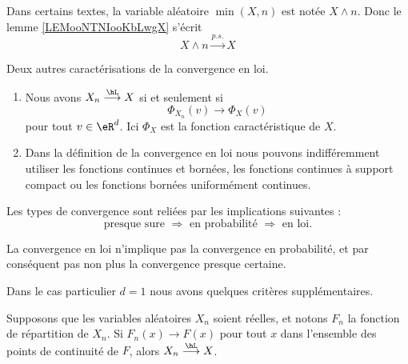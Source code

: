 \begin{normaltext}
	Dans certains textes, la variable aléatoire \( \min(X,n)\) est notée \( X\wedge n\). Donc le lemme \ref{LEMooNTNIooKbLwgX} s'écrit
	\begin{equation}
		X\wedge n\stackrel{p.s.}{\longrightarrow}X
	\end{equation}
\end{normaltext}

\begin{proposition}     \label{PrpopCaractCvL}
	Deux autres caractérisations de la convergence en loi.
	\begin{enumerate}
		\item
		      Nous avons \( X_n\stackrel{\hL}{\longrightarrow}X\) si et seulement si
		      \begin{equation}
			      \Phi_{X_n}(v)\to\Phi_X(v)
		      \end{equation}
		      pour tout \( v\in\eR^d\). Ici \( \Phi_X\) est la fonction caractéristique de \( X\).
		\item
		      Dans la définition de la convergence en loi nous pouvons indifféremment utiliser les fonctions continues et bornées, les fonctions continues à support compact ou les fonctions bornées uniformément continues.
	\end{enumerate}
\end{proposition}

\begin{proposition} \label{PropJFVJDuX}
	Les types de convergence sont reliées par les implications suivantes :
	\begin{equation}
		\text{presque sure }\Rightarrow\text{ en probabilité }\Rightarrow\text{ en loi}.
	\end{equation}
\end{proposition}
La convergence en loi n'implique pas la convergence en probabilité, et par conséquent pas non plus la convergence presque certaine.

Dans le cas particulier \( d=1\) nous avons quelques critères supplémentaires.

\begin{proposition}     \label{PropoFnrepCvL}
	Supposons que les variables aléatoires \( X_n\) soient réelles, et notons \( F_n\) la fonction de répartition de \( X_n\). Si \( F_n(x)\to F(x)\) pour tout \( x\) dans l'ensemble des points de continuité de \( F\), alors \( X_n\stackrel{\hL}{\longrightarrow}X\).
\end{proposition}


